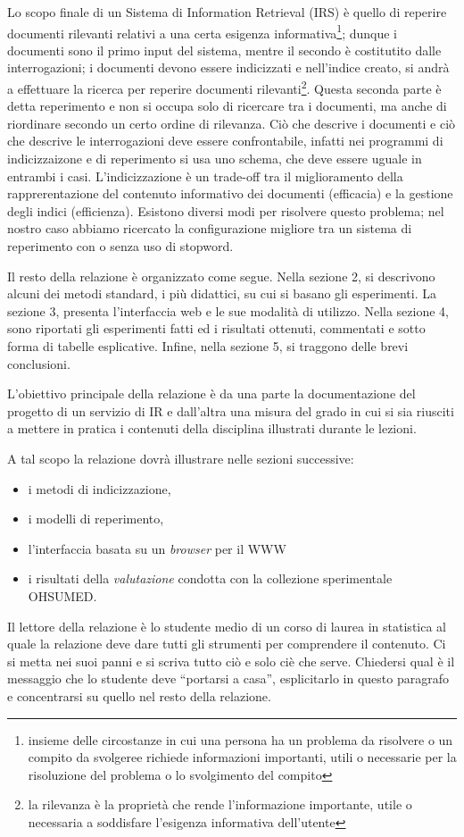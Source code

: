 \documentclass[runningheads]{llncs}
\begin{document}
Lo scopo finale di un Sistema di Information Retrieval (IRS) \`e quello di reperire documenti
 rilevanti relativi a una certa esigenza informativa\footnote{insieme delle circostanze in cui una
 persona ha un problema da risolvere o un compito da svolgeree richiede informazioni
 importanti, utili o necessarie per la risoluzione del problema o lo svolgimento del compito};
  dunque i documenti sono il primo input del sistema, mentre il secondo \`e
  costitutito dalle interrogazioni; i documenti devono essere
  indicizzati e nell'indice creato, si andr\`a a effettuare la ricerca per reperire documenti rilevanti\footnote{la rilevanza \`e la propriet\`a che rende l'informazione importante, utile o necessaria a soddisfare l'esigenza informativa dell'utente}. Questa seconda parte \`e detta reperimento e non si occupa solo di ricercare tra i documenti, ma anche di riordinare secondo un certo ordine di rilevanza. Ci\`o che descrive i documenti e ci\`o che descrive le interrogazioni deve essere confrontabile, infatti nei programmi di indicizzaizone e di reperimento si usa uno schema, che deve essere uguale
  in entrambi i casi.
L'indicizzazione \`e un trade-off tra il  miglioramento della rapprerentazione del
contenuto informativo dei documenti (efficacia) e la gestione degli indici (efficienza).
Esistono diversi modi per risolvere questo problema; nel nostro caso abbiamo ricercato
la configurazione migliore tra un sistema di reperimento con o senza uso di stopword.


Il resto della relazione \`e organizzato come segue. Nella sezione 2, si descrivono
alcuni dei metodi standard, i pi\`u didattici, su cui si basano gli esperimenti.
La sezione 3, presenta l'interfaccia web e le sue modalit\`a di utilizzo.
Nella sezione 4, sono riportati gli esperimenti fatti ed i risultati ottenuti,
commentati e sotto forma di tabelle esplicative. Infine, nella sezione 5,
si traggono delle brevi conclusioni.




L'obiettivo principale della relazione \`e da una parte la
documentazione del progetto di un servizio di {IR} e dall'altra una
misura del grado in cui si sia riusciti a mettere in pratica i
contenuti della disciplina illustrati durante le lezioni.

A tal scopo la relazione dovr\`a illustrare nelle sezioni successive:
\begin{itemize}
\item i metodi di indicizzazione,
\item i modelli di reperimento,
\item l'interfaccia basata su un \textit{browser} per il {WWW}
\item i risultati della \emph{valutazione} condotta con la collezione
  sperimentale OHSUMED.
\end{itemize}
Il lettore della relazione \`e lo studente medio di un corso di laurea
in statistica al quale la relazione deve dare tutti gli strumenti per
comprendere il contenuto.  Ci si metta nei suoi panni e si scriva
tutto ci\`o e solo ci\`e che serve.  Chiedersi qual \`e il messaggio
che lo studente deve ``portarsi a casa'', esplicitarlo in questo
paragrafo e concentrarsi su quello nel resto della relazione.
\end{document}
